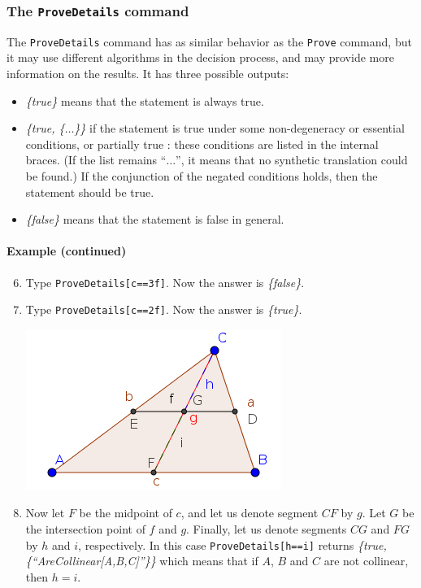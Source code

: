 \documentclass{article}
\begin{document}
\subsubsection{The \texttt{ProveDetails} command}
The \texttt{ProveDetails} command has as similar behavior as the \texttt{Prove} command, but it may use different algorithms in the decision process, and may provide more information on the results. It has three possible outputs:
\begin{itemize}
    \item \textit{\{true\}} means that the statement is always true.
    \item \textit{\{true, \{$\ldots$\}\}} if the statement is true under some non-degeneracy \cite{Chou,RecioVelez} or essential \cite{KovacsRecioSolyomGecse} conditions, or partially true \cite{BotanaRecio2016,KovacsRecioVelez}: these conditions are listed in the internal braces. (If the list remains ``$\ldots$'', it means that no synthetic translation could be found.)  If the conjunction of the negated conditions holds, then the statement should be true.
    \item \textit{\{false\}} means that the statement is false in general.
\end{itemize}
\paragraph{Example (continued)}
\begin{enumerate}
\setcounter{enumi}{5}
    \item Type \texttt{ProveDetails[c==3f]}. Now the answer is \textit{\{false\}}.
    \item Type \texttt{ProveDetails[c==2f]}. Now the answer is \textit{\{true\}}.
\begin{center}
\includegraphics[scale=0.5]{ProveDetails-example-1}
\end{center}
    \item Now let $F$ be the midpoint of $c$, and let us denote segment $CF$ by $g$. Let $G$ be the intersection point of $f$ and $g$. Finally, let us denote segments $CG$ and $FG$ by $h$ and $i$, respectively. In this case \texttt{ProveDetails[h==i]} returns \textit{\{true,\{``AreCollinear[A,B,C]''\}\}} which means that if $A$, $B$ and $C$ are not collinear, then $h=i$.
\end{enumerate}
\end{document}
